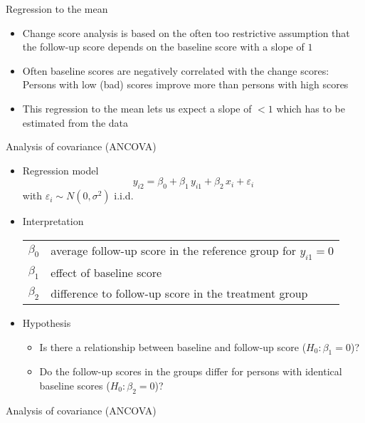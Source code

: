 \documentclass{beamer}
\begin{document}
\begin{frame}{Regression to the mean}
\begin{itemize}
  \item Change score analysis is based on the often too restrictive
    assumption that the follow-up score depends on the baseline score with
    a slope of $1$
  \item Often baseline scores are negatively correlated with the change
    scores:\\
    Persons with low (bad) scores improve more than persons with high scores
  \item This regression to the mean lets us expect a slope of $< 1$ which
    has to be estimated from the data
\end{itemize}
\end{frame}

\begin{frame}{Analysis of covariance (ANCOVA)}
\begin{itemize}
  \item Regression model
    \[
      y_{i2} = \beta_0 + \beta_1 \, y_{i1} + \beta_2 \, x_i + \varepsilon_i
    \]
    with $\varepsilon_i \sim N(0, \sigma^2)$ i.i.d.
  \item Interpretation
    \begin{tabular}{lp{10cm}}
    $\beta_0$ & average follow-up score in the reference group for $y_{i1} = 0$\\
    $\beta_1$ & effect of baseline score\\
    $\beta_2$ & difference to follow-up score in the treatment group
    \end{tabular}
  \item Hypothesis
    \begin{itemize}
        \item Is there a relationship between baseline and follow-up score ($H_0\colon \beta_1 = 0$)?
        \item Do the follow-up scores in the groups differ for persons with
          identical baseline scores ($H_0\colon \beta_2 = 0$)?
    \end{itemize}
\end{itemize}
\end{frame}


\begin{frame}{Analysis of covariance (ANCOVA)}
\begin{center}
\end{center}
\end{frame}
\end{document}
